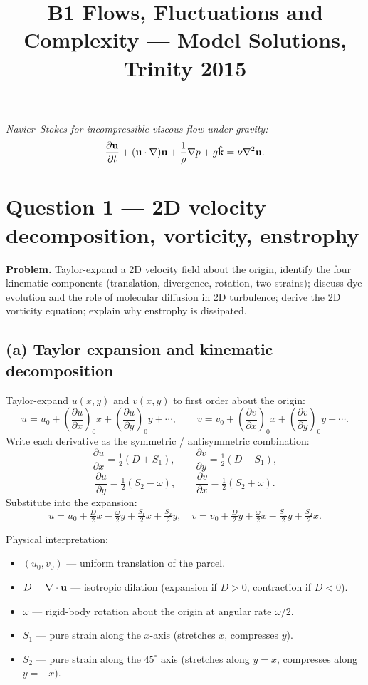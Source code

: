 \documentclass[11pt]{article}
\title{B1 Flows, Fluctuations and Complexity --- Model Solutions, Trinity 2015}
\author{}
\date{}
\newcommand{\pd}[2]{\frac{\partial #1}{\partial #2}}
\newcommand{\Lap}{\nabla^{2}}
\begin{document}
\maketitle

\noindent\textit{Navier--Stokes for incompressible viscous flow under gravity:}
\begin{equation}
\pd{\vb u}{t} + (\vb u\cdot\nabla)\vb u + \frac{1}{\rho}\nabla p + g\hat{\vb k} = \nu\Lap\vb u.
\label{eq:NS}
\end{equation}

\section*{Question 1 --- 2D velocity decomposition, vorticity, enstrophy}

\textbf{Problem.} Taylor-expand a 2D velocity field about the origin, identify the four kinematic components (translation, divergence, rotation, two strains); discuss dye evolution and the role of molecular diffusion in 2D turbulence; derive the 2D vorticity equation; explain why enstrophy is dissipated.

\subsection*{(a) Taylor expansion and kinematic decomposition}

Taylor-expand $u(x,y)$ and $v(x,y)$ to first order about the origin:
\[ u = u_0 + (\pd{u}{x})_0 x + (\pd{u}{y})_0 y + \cdots, \qquad v = v_0 + (\pd{v}{x})_0 x + (\pd{v}{y})_0 y + \cdots. \]
Write each derivative as the symmetric / antisymmetric combination:
\[ \pd{u}{x} = \tfrac12(D + S_1),\qquad \pd{v}{y} = \tfrac12(D - S_1), \]
\[ \pd{u}{y} = \tfrac12(S_2 - \omega),\qquad \pd{v}{x} = \tfrac12(S_2 + \omega). \]
Substitute into the expansion:
\begin{equation}
\boxed{\;u = u_0 + \tfrac{D}{2}x - \tfrac{\omega}{2}y + \tfrac{S_1}{2}x + \tfrac{S_2}{2}y,\quad v = v_0 + \tfrac{D}{2}y + \tfrac{\omega}{2}x - \tfrac{S_1}{2}y + \tfrac{S_2}{2}x.\;}
\label{eq:decomp}
\end{equation}

Physical interpretation:
\begin{itemize}
  \item $(u_0,v_0)$ --- uniform translation of the parcel.
  \item $D = \nabla\cdot\vb u$ --- isotropic dilation (expansion if $D>0$, contraction if $D<0$).
  \item $\omega$ --- rigid-body rotation about the origin at angular rate $\omega/2$.
  \item $S_1$ --- pure strain along the $x$-axis (stretches $x$, compresses $y$).
  \item $S_2$ --- pure strain along the $45^\circ$ axis (stretches along $y=x$, compresses along $y=-x$).
\end{itemize}
\end{document}
